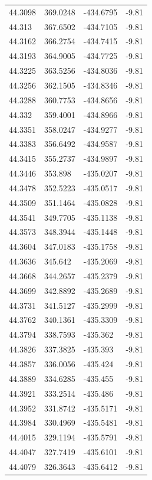 \begin{table}[H]
\begin{tabular}{llll}
44.3098 & 369.0248 & -434.6795 & -9.81 \\
44.313 & 367.6502 & -434.7105 & -9.81 \\
44.3162 & 366.2754 & -434.7415 & -9.81 \\
44.3193 & 364.9005 & -434.7725 & -9.81 \\
44.3225 & 363.5256 & -434.8036 & -9.81 \\
44.3256 & 362.1505 & -434.8346 & -9.81 \\
44.3288 & 360.7753 & -434.8656 & -9.81 \\
44.332 & 359.4001 & -434.8966 & -9.81 \\
44.3351 & 358.0247 & -434.9277 & -9.81 \\
44.3383 & 356.6492 & -434.9587 & -9.81 \\
44.3415 & 355.2737 & -434.9897 & -9.81 \\
44.3446 & 353.898 & -435.0207 & -9.81 \\
44.3478 & 352.5223 & -435.0517 & -9.81 \\
44.3509 & 351.1464 & -435.0828 & -9.81 \\
44.3541 & 349.7705 & -435.1138 & -9.81 \\
44.3573 & 348.3944 & -435.1448 & -9.81 \\
44.3604 & 347.0183 & -435.1758 & -9.81 \\
44.3636 & 345.642 & -435.2069 & -9.81 \\
44.3668 & 344.2657 & -435.2379 & -9.81 \\
44.3699 & 342.8892 & -435.2689 & -9.81 \\
44.3731 & 341.5127 & -435.2999 & -9.81 \\
44.3762 & 340.1361 & -435.3309 & -9.81 \\
44.3794 & 338.7593 & -435.362 & -9.81 \\
44.3826 & 337.3825 & -435.393 & -9.81 \\
44.3857 & 336.0056 & -435.424 & -9.81 \\
44.3889 & 334.6285 & -435.455 & -9.81 \\
44.3921 & 333.2514 & -435.486 & -9.81 \\
44.3952 & 331.8742 & -435.5171 & -9.81 \\
44.3984 & 330.4969 & -435.5481 & -9.81 \\
44.4015 & 329.1194 & -435.5791 & -9.81 \\
44.4047 & 327.7419 & -435.6101 & -9.81 \\
44.4079 & 326.3643 & -435.6412 & -9.81 \\

\end{tabular}
\end{table}

